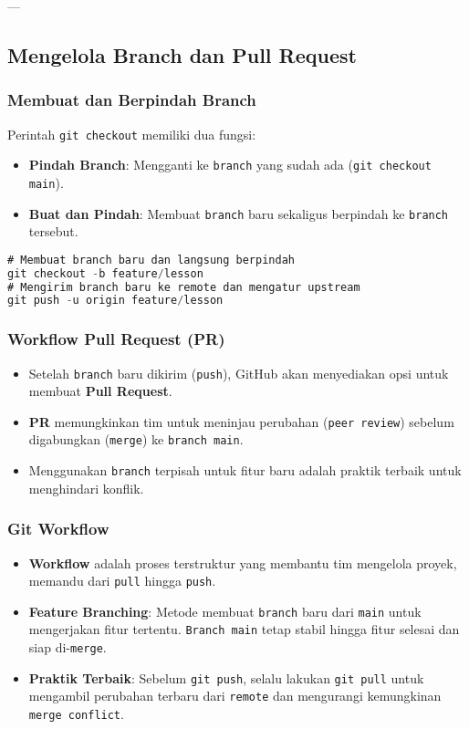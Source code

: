 \documentclass{article}
\begin{document}
---

\subsection{Mengelola Branch dan Pull Request}

\subsubsection{Membuat dan Berpindah Branch}
Perintah \texttt{git checkout} memiliki dua fungsi:
\begin{itemize}
    \item \textbf{Pindah Branch}: Mengganti ke \texttt{branch} yang sudah ada (\texttt{git checkout main}).
    \item \textbf{Buat dan Pindah}: Membuat \texttt{branch} baru sekaligus berpindah ke \texttt{branch} tersebut.
\end{itemize}

\begin{lstlisting}[language=SQL, caption={Membuat Branch dan Berpindah}, captionpos=b]
# Membuat branch baru dan langsung berpindah
git checkout -b feature/lesson 
# Mengirim branch baru ke remote dan mengatur upstream
git push -u origin feature/lesson
\end{lstlisting}

\subsubsection{Workflow Pull Request (PR)}
\begin{itemize}
    \item Setelah \texttt{branch} baru dikirim (\texttt{push}), GitHub akan menyediakan opsi untuk membuat \textbf{Pull Request}.
    \item \textbf{PR} memungkinkan tim untuk meninjau perubahan (\texttt{peer review}) sebelum digabungkan (\texttt{merge}) ke \texttt{branch main}.
    \item Menggunakan \texttt{branch} terpisah untuk fitur baru adalah praktik terbaik untuk menghindari konflik.
\end{itemize}

\subsubsection{Git Workflow}
\begin{itemize}
    \item \textbf{Workflow} adalah proses terstruktur yang membantu tim mengelola proyek, memandu dari \texttt{pull} hingga \texttt{push}.
    \item \textbf{Feature Branching}: Metode membuat \texttt{branch} baru dari \texttt{main} untuk mengerjakan fitur tertentu. \texttt{Branch main} tetap stabil hingga fitur selesai dan siap di-\texttt{merge}.
    \item \textbf{Praktik Terbaik}: Sebelum \texttt{git push}, selalu lakukan \texttt{git pull} untuk mengambil perubahan terbaru dari \texttt{remote} dan mengurangi kemungkinan \texttt{merge conflict}.
\end{itemize}
\end{document}
